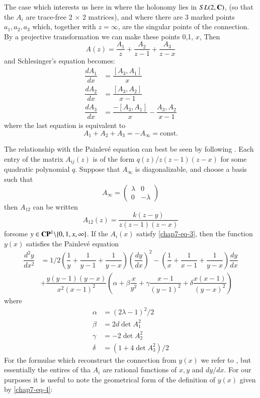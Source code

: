 The case which interests us here in where the holonomy lies in $SL(2,\mathbf{C})$, (so that the $A_{i}$ are trace-free 2 $\times$ 2 matrices), and where there are 3 marked points $a_{1}, a_{2}, a_{3}$ which, together with $z=\infty$, are the singular points of the connection. By a projective transformation we can make these points 0,1, $x$, Then
$$
A(z)= \dfrac{A_{1}}{z} + \dfrac{A_{2}}{z-1} + \dfrac{A_{3}}{z-x}
$$
and Schlesinger's equation becomes:
\begin{align*}\label{chap7-eq-3}
\dfrac{dA_{1}}{dx} &= \dfrac{[A_{3}, A_{1}]}{x}\nonumber\\
\dfrac{dA_{2}}{dx} &= \dfrac{[A_{3}, A_{2}]}{x-1}\tag{3}\\
\dfrac{dA_{3}}{dx} &= \dfrac{-[A_{3}, A_{1}]}{x} - \dfrac{A_{3}, A_{2}}{x-1}\nonumber
\end{align*}
where the last equation is equivalent to
$$
A_{1} + A_{2} +A_{3} = -A_{\infty} = \text{const}.
$$

The relationship with the Painlev\'e equation can best be seen by following \cite{chap7-key8}. Each entry of the matrix $A_{ij}(z)$ is of the form $q(z)/z(z-1)(z-x)$ for some quadratic polynomial $q$. Suppose that $A_{\infty}$ is diagonalizable, and choose a basis such that
$$
A_{\infty} =
\left(\begin{matrix}
\lambda & 0 \\
0 & -\lambda 
\end{matrix}\right)
$$
then $A_{12}$ can be written
\begin{equation*}\label{chap7-eq-4}
A_{12}(z) = \dfrac{k(z-y)}{z(z-1)(z-x)}\tag{4}
\end{equation*}
for\pageoriginale some $y\in\mathbf{C}\mathbf{P}^{1}\backslash \{0,1,x,\infty\}$. If the $A_{i}(x)$ satisfy \eqref{chap7-eq-3}, then the function $y(x)$ satisfies the Painlev\'e equation
{\small
\begin{align*}\label{chap7-eq-5}
 \dfrac{d^{2}y}{dx^{2}} &= 1/2\left(\dfrac{1}{y} + \dfrac{1}{y-1} + \dfrac{1}{y-x} \right)\left(\dfrac{dy}{dx}\right)^{2}
 -\left( \dfrac{1}{x} + \dfrac{1}{x-1} + \dfrac{1}{y-x}\right)\dfrac{dy}{dx}\nonumber\\
 & +\dfrac{y(y-1)(y-x)}{x^{2}(x-1)^{2}} \left(\alpha + \beta\dfrac{x}{y^{2}} + \gamma\dfrac{x-1}{(y-1)^{2}} + \delta\dfrac{x(x-1)}{(y-x)^{2}} \right)\tag{5}
\end{align*}}\relax
where
\begin{align*}\label{chap7-eq-6}
\alpha &= (2\lambda -1)^{2}/2\nonumber\\
\beta &= 2d\det A_{1}^{2}\nonumber\\
\gamma &= -2\det A_{2}^{2}\nonumber\\
\delta &= (1 + 4\det A_{3}^{2})/2\tag{6}
\end{align*} 
For the formulae which reconstruct the connection from $y(x)$ we refer to \cite{chap7-key8}, but essentially the entires of tha $A_{i}$ are rational functions of $x, y$ and $dy/dx$. For our purposes it is useful to  note the geometrical form of the definition of $y(x)$ given by \ref{chap7-eq-4}:

